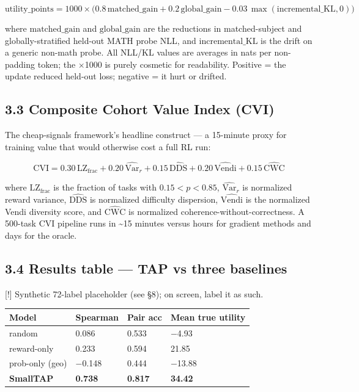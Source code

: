 \documentclass[11pt,letterpaper]{article}
\begin{document}
\[
\text{utility\_points} = 1000 \times \big( 0.8\,\text{matched\_gain} + 0.2\,\text{global\_gain} - 0.03\,\max(\text{incremental\_KL}, 0) \big)
\]

where $\text{matched\_gain}$ and $\text{global\_gain}$ are the reductions in matched-subject and globally-stratified held-out MATH probe NLL, and $\text{incremental\_KL}$ is the drift on a generic non-math probe. All NLL/KL values are averages in nats per non-padding token; the $\times$1000 is purely cosmetic for readability. Positive = the update reduced held-out loss; negative = it hurt or drifted.

\subsection*{3.3 Composite Cohort Value Index (CVI)}

The cheap-signals framework's headline construct --- a 15-minute proxy for training value that would otherwise cost a full RL run:

\[
\text{CVI} = 0.30\,\text{LZ}_{\text{frac}} + 0.20\,\widehat{\text{Var}}_r + 0.15\,\widehat{\text{DDS}} + 0.20\,\widehat{\text{Vendi}} + 0.15\,\widehat{\text{CWC}}
\]

where $\text{LZ}_{\text{frac}}$ is the fraction of tasks with $0.15 < p < 0.85$, $\widehat{\text{Var}}_r$ is normalized reward variance, $\widehat{\text{DDS}}$ is normalized difficulty dispersion, $\widehat{\text{Vendi}}$ is the normalized Vendi diversity score, and $\widehat{\text{CWC}}$ is normalized coherence-without-correctness. A 500-task CVI pipeline runs in \textasciitilde{}15 minutes versus hours for gradient methods and days for the oracle.

\subsection*{3.4 Results table --- TAP vs three baselines}

[!] Synthetic 72-label placeholder (see §8); on screen, label it as such.

\begin{center}
\begin{tabular}{llll}
\toprule
Model & Spearman & Pair acc & Mean true utility \\
\midrule
random & 0.086 & 0.533 & $-$4.93 \\
reward-only & 0.233 & 0.594 & 21.85 \\
prob-only (geo) & $-$0.148 & 0.444 & $-$13.88 \\
\textbf{SmallTAP} & \textbf{0.738} & \textbf{0.817} & \textbf{34.42} \\
\bottomrule
\end{tabular}
\end{center}
\end{document}

